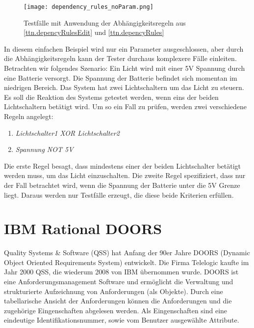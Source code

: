 \begin{figure}[h]
  \begin{center}
    \texttt{[image: dependency\_rules\_noParam.png]}
  		  \caption{Testfälle mit Anwendung der Abhängigkeitsregeln aus \ref{ttn.depencyRulesEdit} und \ref{ttn.depencyRules}}
     \label{ttn.testsequence}
  \end{center}
\end{figure}

In diesem einfachen Beispiel wird nur ein Parameter ausgeschlossen, aber durch die Abhängigkeitsregeln kann der Tester durchaus komplexere Fälle einleiten. Betrachten wir folgendes Szenario: Ein Licht wird mit einer 5V Spannung durch eine Batterie versorgt. Die Spannung der Batterie befindet sich momentan im niedrigen Bereich. Das System hat zwei Lichtschaltern um das Licht zu steuern. Es soll die Reaktion des Systems getestet werden, wenn eins der beiden Lichtschaltern betätigt wird. Um so ein Fall zu prüfen, werden zwei verschiedene Regeln angelegt:

\begin{enumerate}
\item \textit{Lichtschalter1 XOR Lichtschalter2}
\item \textit{Spannung NOT 5V}
\end{enumerate}

Die erste Regel besagt, dass mindestens einer der beiden Lichtschalter betätigt werden muss, um das Licht einzuschalten. Die zweite Regel spezifiziert, dass nur der Fall betrachtet wird, wenn die Spannung der Batterie unter die 5V Grenze liegt. Daraus werden nur Testfälle erzeugt, die diese beide Kriterien erfüllen.





\newpage
\section{IBM Rational DOORS}\label{sec:DOORS}
\paragraph{}

Quality Systems \& Software (QSS) hat Anfang der 90er Jahre DOORS (Dynamic Object Oriented Requirements System) entwickelt. Die Firma Telelogic kaufte im Jahr 2000 QSS, die wiederum 2008 von IBM übernommen wurde. DOORS ist eine Anforderungsmanagement Software und ermöglicht die Verwaltung und strukturierte Aufzeichnung von Anforderungen (als Objekte). Durch eine tabellarische Ansicht der Anforderungen können die Anforderungen und die zugehörige Eingenschaften abgelesen werden. Als Eingenschaften sind eine eindeutige Identifikationsnummer, sowie vom Benutzer ausgewählte Attribute.\\


